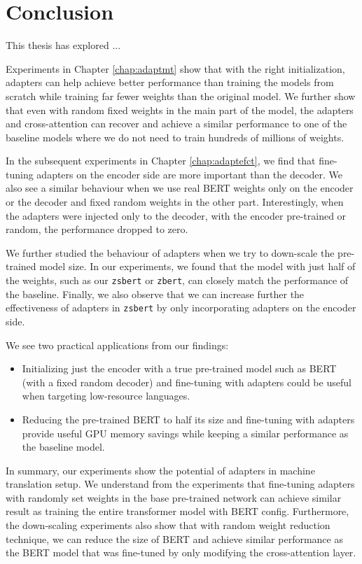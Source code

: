 \chapter*{Conclusion}
This thesis has explored ...

Experiments in Chapter \ref{chap:adaptmt} show that with the right initialization, adapters can help achieve better performance than training the models from scratch while training far fewer weights than the original model. We further show that even with random fixed weights in the main part of the model, the adapters and cross-attention can recover and achieve a similar performance to one of the baseline models where we do not need to train hundreds of millions of weights.

In the subsequent experiments in Chapter \ref{chap:adaptefct}, we find that fine-tuning adapters on the encoder side are more important than the decoder. We also see a similar behaviour when we use real BERT weights only on the encoder or the decoder and fixed random weights in the other part. Interestingly, when the adapters were injected only to the decoder, with the encoder pre-trained or random, the performance dropped to zero.

We further studied the behaviour of adapters when we try to down-scale the pre-trained model size. In our experiments, we found that the model with just half of the weights, such as our \texttt{zsbert} or \texttt{zbert}, can closely match the performance of the baseline. Finally, we also observe that we can increase further the effectiveness of adapters in \texttt{zsbert} by only incorporating adapters on the encoder side.

We see two practical applications from our findings:
\begin{itemize}
    \item Initializing just the encoder with a true pre-trained model such as BERT (with a fixed random decoder) and fine-tuning with adapters could be useful when targeting low-resource languages.
    \item Reducing the pre-trained BERT to half its size and fine-tuning with adapt\-ers provide useful GPU memory savings while keeping a similar performance as the baseline model.
\end{itemize}

In summary, our experiments show the potential of adapters in machine translation setup. We understand from the experiments that fine-tuning adapters with randomly set weights in the base pre-trained network can achieve similar result as training the entire transformer model with BERT config. Furthermore, the down-scaling experiments also show that with random weight reduction technique, we can reduce the size of BERT and achieve similar performance as the BERT model that was fine-tuned by only modifying the cross-attention layer.